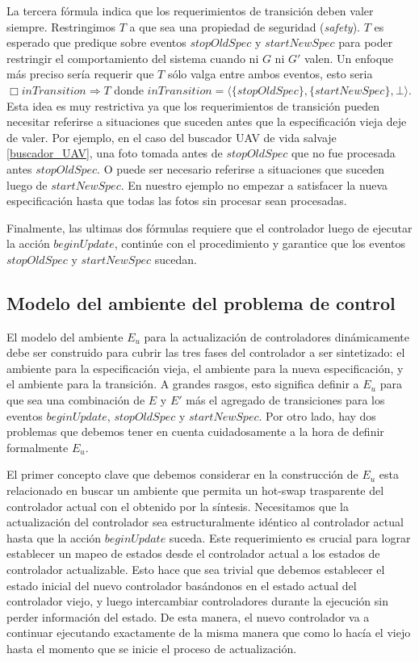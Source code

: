 La tercera fórmula indica que los requerimientos de transición deben valer siempre. Restringimos $T$ a que sea una
propiedad de seguridad (\emph{safety}). $T$ es esperado que predique sobre eventos $stopOldSpec$ y $startNewSpec$ para
poder restringir el comportamiento del sistema cuando ni $G$ ni $G'$ valen. Un enfoque más preciso sería requerir que
$T$ sólo valga entre ambos eventos, esto seria $\Box inTransition \Longrightarrow T$ donde $inTransition =
\langle\{stopOldSpec\},\{startNewSpec\}, \bot\rangle$. Esta idea es muy restrictiva ya que los requerimientos de transición
pueden necesitar referirse a situaciones que suceden antes que la especificación vieja deje de valer. Por ejemplo, en el
caso del buscador UAV de vida salvaje \ref{buscador_UAV}, una foto tomada antes de $stopOldSpec$ que no fue
procesada antes $stopOldSpec$. O puede ser necesario referirse a situaciones que suceden luego de $startNewSpec$. En
nuestro ejemplo no empezar a satisfacer la nueva especificación hasta que todas las fotos sin procesar sean procesadas.

Finalmente, las ultimas dos fórmulas requiere que el controlador luego de ejecutar la acción $beginUpdate$, continúe con
el procedimiento y garantice que los eventos $stopOldSpec$ y $startNewSpec$ sucedan.

\subsection{Modelo del ambiente del problema de control}

El modelo del ambiente $E_u$ para la actualización de controladores dinámicamente debe ser construido para cubrir las
tres fases del controlador a ser sintetizado: el ambiente para la especificación vieja, el ambiente para la nueva
especificación, y el ambiente para la transición. A grandes rasgos, esto significa definir a $E_u$ para que sea una
combinación de $E$ y $E'$ más el agregado de transiciones para los eventos $beginUpdate$, $stopOldSpec$ y
$startNewSpec$. Por otro lado, hay dos problemas que debemos tener en cuenta cuidadosamente a la hora de definir
formalmente $E_u$.

El primer concepto clave que debemos considerar en la construcción de $E_u$ esta relacionado en buscar un ambiente que
permita un hot-swap trasparente del controlador actual con el obtenido por la síntesis. Necesitamos que la actualización
del controlador sea estructuralmente idéntico al controlador actual hasta que la acción $beginUpdate$ suceda. Este
requerimiento es crucial para lograr establecer un mapeo de estados desde el controlador actual a los estados de controlador
actualizable. Esto hace que sea trivial que debemos establecer el estado inicial del nuevo controlador basándonos en el
estado actual del controlador viejo, y luego intercambiar controladores durante la ejecución sin perder información del
estado. De esta manera, el nuevo controlador va a continuar ejecutando exactamente de la misma manera que como lo hacía
el viejo hasta el momento que se inicie el proceso de actualización.

